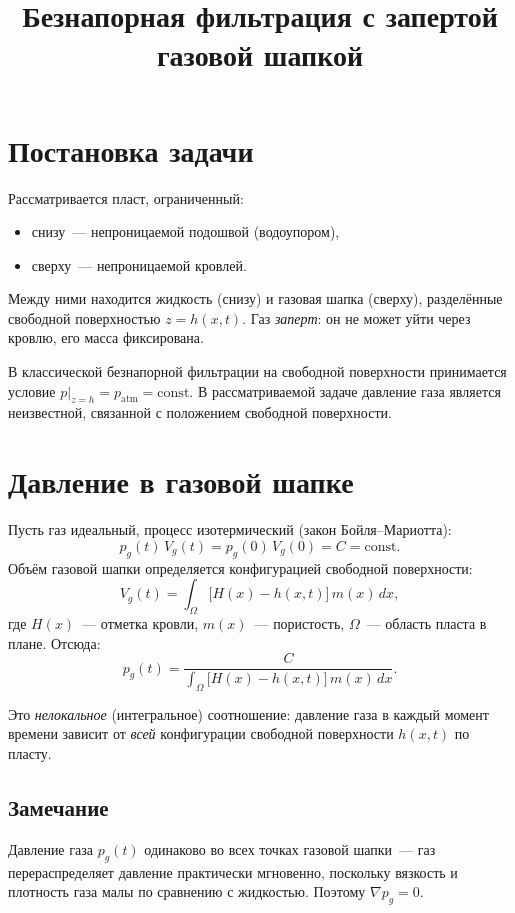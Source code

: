 \documentclass[12pt,a4paper]{article}
\title{Безнапорная фильтрация с запертой газовой шапкой}
\author{}
\date{}
\begin{document}
\maketitle

\section{Постановка задачи}

Рассматривается пласт, ограниченный:
\begin{itemize}[nosep]
  \item снизу~--- непроницаемой подошвой (водоупором),
  \item сверху~--- непроницаемой кровлей.
\end{itemize}
Между ними находится жидкость (снизу) и газовая шапка (сверху), разделённые свободной поверхностью $z = h(x, t)$. Газ \emph{заперт}: он не может уйти через кровлю, его масса фиксирована.

В классической безнапорной фильтрации на свободной поверхности принимается условие $p\big|_{z=h} = p_{\mathrm{atm}} = \mathrm{const}$. В рассматриваемой задаче давление газа является неизвестной, связанной с положением свободной поверхности.

\section{Давление в газовой шапке}

Пусть газ идеальный, процесс изотермический (закон Бойля--Мариотта):
\begin{equation}\label{eq:boyle}
  p_g(t)\, V_g(t) = p_g(0)\, V_g(0) = C = \mathrm{const}.
\end{equation}
Объём газовой шапки определяется конфигурацией свободной поверхности:
\begin{equation}\label{eq:Vg}
  V_g(t) = \int_\Omega \bigl[H(x) - h(x,t)\bigr]\, m(x)\, dx,
\end{equation}
где $H(x)$~--- отметка кровли, $m(x)$~--- пористость, $\Omega$~--- область пласта в плане. Отсюда:
\begin{equation}\label{eq:pg}
  \boxed{p_g(t) = \frac{C}{\displaystyle\int_\Omega \bigl[H(x) - h(x,t)\bigr]\, m(x)\, dx}.}
\end{equation}

Это \emph{нелокальное} (интегральное) соотношение: давление газа в каждый момент времени зависит от \emph{всей} конфигурации свободной поверхности $h(x,t)$ по пласту.

\subsection*{Замечание}
Давление газа $p_g(t)$ одинаково во всех точках газовой шапки~--- газ перераспределяет давление практически мгновенно, поскольку вязкость и плотность газа малы по сравнению с жидкостью. Поэтому $\nabla p_g = 0$.
\end{document}
